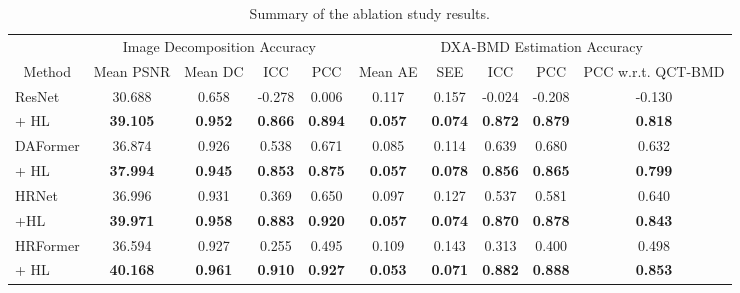 \documentclass[times,twocolumn,final]{elsarticle}
\begin{document}
\begin{table}[!t]
\caption{Summary of the ablation study results.}
\centering
\small
\begin{tabular}{|l|cccc|ccccc|}
\hline
\multicolumn{1}{|c|}{}                         & \multicolumn{4}{c|}{Image Decomposition Accuracy}                                  & \multicolumn{5}{c|}{DXA-BMD Estimation Accuracy} \\ \cline{2-10} 
\multicolumn{1}{|c|}{\multirow{-2}{*}{Method}} & Mean PSNR              & Mean DC             & ICC & PCC & Mean AE             & SEE & ICC & PCC & PCC w.r.t. QCT-BMD                   \\ \hline
ResNet                                         & 30.688            & 0.658          & -0.278                & 0.006                 & 0.117          & 0.157                 & -0.024                & -0.208                & -0.130                    \\
+ HL                                           & \textbf{39.105}   & \textbf{0.952} & \textbf{0.866}        & \textbf{0.894}        & \textbf{0.057} & \textbf{0.074}        & \textbf{0.872}        & \textbf{0.879}        & \textbf{0.818}            \\ \hline
DAFormer                                       & 36.874            & 0.926          & 0.538                 & 0.671                 & 0.085          & 0.114                 & 0.639                 & 0.680                 & 0.632                      \\
+ HL                                           & \textbf{37.994}   & \textbf{0.945} & \textbf{0.853}        & \textbf{0.875}        & \textbf{0.057} & \textbf{0.078}        & \textbf{0.856}        & \textbf{0.865}        & \textbf{0.799}             \\ \hline
HRNet                                          & 36.996            & 0.931          & 0.369                 & 0.650                 & 0.097          & 0.127                 & 0.537                 & 0.581                 & 0.640                      \\
+HL                                            & \textbf{39.971}   & \textbf{0.958} & \textbf{0.883}        & \textbf{0.920}        & \textbf{0.057} & \textbf{0.074}        & \textbf{0.870}        & \textbf{0.878}        & \textbf{0.843}             \\ \hline
HRFormer                                       & 36.594            & 0.927          & 0.255                 & 0.495                 & 0.109          & 0.143                 & 0.313                 & 0.400                 & 0.498                      \\
+ HL                                           & \textbf{40.168}   & \textbf{0.961} & \textbf{0.910}        & \textbf{0.927}        &\textbf{0.053}  & \textbf{0.071}        & \textbf{0.882}        & \textbf{0.888}        & \textbf{0.853}             \\ \hline
\end{tabular}
\label{tab:ablation}
\end{table}
\end{document}
